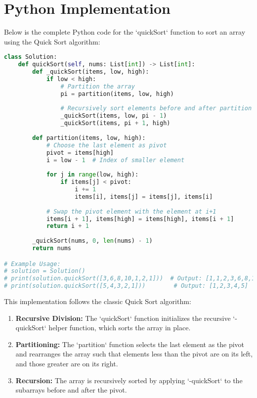 \newpage %
\section*{Python Implementation}

Below is the complete Python code for the `quickSort` function to sort an array using the Quick Sort algorithm:

\begin{fullwidth}
\begin{lstlisting}[language=Python]
class Solution:
    def quickSort(self, nums: List[int]) -> List[int]:
        def _quickSort(items, low, high):
            if low < high:
                # Partition the array
                pi = partition(items, low, high)
                
                # Recursively sort elements before and after partition
                _quickSort(items, low, pi - 1)
                _quickSort(items, pi + 1, high)
        
        def partition(items, low, high):
            # Choose the last element as pivot
            pivot = items[high]
            i = low - 1  # Index of smaller element
            
            for j in range(low, high):
                if items[j] < pivot:
                    i += 1
                    items[i], items[j] = items[j], items[i]
            
            # Swap the pivot element with the element at i+1
            items[i + 1], items[high] = items[high], items[i + 1]
            return i + 1
        
        _quickSort(nums, 0, len(nums) - 1)
        return nums

# Example Usage:
# solution = Solution()
# print(solution.quickSort([3,6,8,10,1,2,1]))  # Output: [1,1,2,3,6,8,10]
# print(solution.quickSort([5,4,3,2,1]))        # Output: [1,2,3,4,5]
\end{lstlisting}
\end{fullwidth}

This implementation follows the classic Quick Sort algorithm:

\begin{enumerate}
    \item \textbf{Recursive Division:} The `quickSort` function initializes the recursive `-quickSort` helper function, which sorts the array in place.
    \item \textbf{Partitioning:} The `partition` function selects the last element as the pivot and rearranges the array such that elements less than the pivot are on its left, and those greater are on its right.
    \item \textbf{Recursion:} The array is recursively sorted by applying `-quickSort` to the subarrays before and after the pivot.
\end{enumerate}

